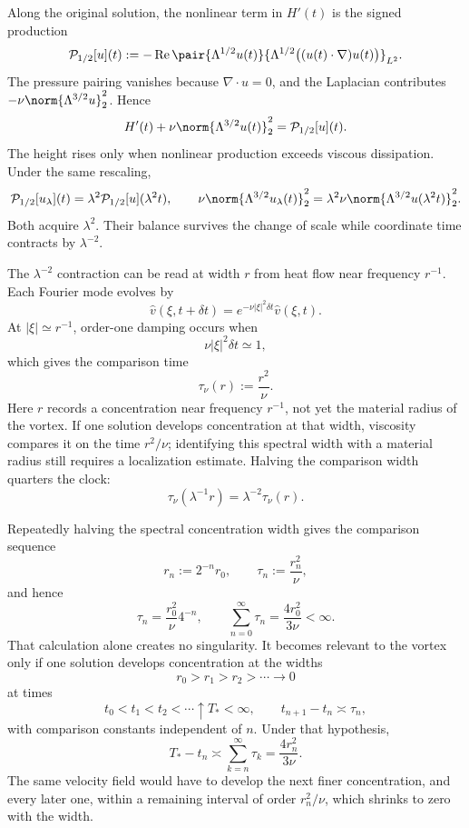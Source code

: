 Along the original solution, the nonlinear term in \(H'(t)\) is the signed production
\[
  \mathcal P_{1/2}[u](t)
  :=
  -\operatorname{Re}
  \pair
    {\Lambda^{1/2}u(t)}
    {\Lambda^{1/2}\bigl((u(t)\cdot\nabla)u(t)\bigr)}_{L^2}.
\]
The pressure pairing vanishes because \(\nabla\cdot u=0\), and the Laplacian contributes \(-\nu\norm{\Lambda^{3/2}u}_2^2\). Hence
\[
  H'(t)
  +
  \nu\norm{\Lambda^{3/2}u(t)}_2^2
  =
  \mathcal P_{1/2}[u](t).
\]
The height rises only when nonlinear production exceeds viscous dissipation. Under the same rescaling,
\[
  \mathcal P_{1/2}[u_\lambda](t)
  =
  \lambda^2\mathcal P_{1/2}[u](\lambda^2t),
  \qquad
  \nu\norm{\Lambda^{3/2}u_\lambda(t)}_2^2
  =
  \lambda^2\nu\norm{\Lambda^{3/2}u(\lambda^2t)}_2^2.
\]
Both acquire \(\lambda^2\). Their balance survives the change of scale while coordinate time contracts by \(\lambda^{-2}\).


The \(\lambda^{-2}\) contraction can be read at width \(r\) from heat flow near frequency \(r^{-1}\). Each Fourier mode evolves by
\[
  \widehat v(\xi,t+\delta t)
  =
  e^{-\nu|\xi|^2\delta t}\widehat v(\xi,t).
\]
At \(|\xi|\simeq r^{-1}\), order-one damping occurs when
\[
  \nu|\xi|^2\delta t\simeq1,
\]
which gives the comparison time
\[
  \tau_\nu(r)
  :=
  \frac{r^2}{\nu}.
\]
Here \(r\) records a concentration near frequency \(r^{-1}\), not yet the material radius of the vortex. If one solution develops concentration at that width, viscosity compares it on the time \(r^2/\nu\); identifying this spectral width with a material radius still requires a localization estimate. Halving the comparison width quarters the clock:
\[
  \tau_\nu(\lambda^{-1}r)
  =
  \lambda^{-2}\tau_\nu(r).
\]


Repeatedly halving the spectral concentration width gives the comparison sequence
\[
  r_n:=2^{-n}r_0,
  \qquad
  \tau_n:=\frac{r_n^2}{\nu},
\]
and hence
\[
  \tau_n
  =
  \frac{r_0^2}{\nu}4^{-n},
  \qquad
  \sum_{n=0}^{\infty}\tau_n
  =
  \frac{4r_0^2}{3\nu}
  <
  \infty.
\]
That calculation alone creates no singularity. It becomes relevant to the vortex only if one \NavierStokes{} solution develops concentration at the widths
\[
  r_0>r_1>r_2>\cdots\longrightarrow0
\]
at times
\[
  t_0<t_1<t_2<\cdots\uparrow T_*<\infty,
  \qquad
  t_{n+1}-t_n\asymp\tau_n,
\]
with comparison constants independent of \(n\). Under that hypothesis,
\[
  T_*-t_n
  \asymp
  \sum_{k=n}^{\infty}\tau_k
  =
  \frac{4r_n^2}{3\nu}.
\]
The same velocity field would have to develop the next finer concentration, and every later one, within a remaining interval of order \(r_n^2/\nu\), which shrinks to zero with the width.
